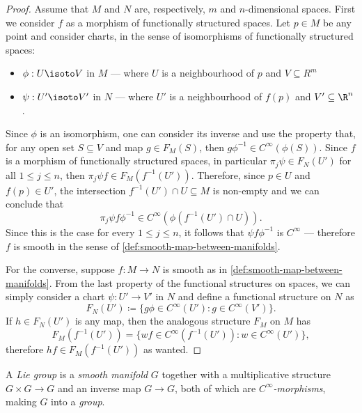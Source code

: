 \begin{proof}
Assume that \(M\) and \(N\) are, respectively, \(m\) and \(n\)-dimensional
spaces. First we consider \(f\) as a morphism of functionally structured spaces.
Let \(p \in M\) be any point and consider charts, in the sense of isomorphisms
of functionally structured spaces:
\begin{itemize}\setlength\itemsep{0em}
\item \(\phi: U \isoto V\) in \(M\) --- where \(U\) is a neighbourhood of \(p\)
  and \(V \subseteq R^m\)

\item \(\psi: U' \isoto V'\) in \(N\) --- where \(U'\) is a neighbourhood of
  \(f(p)\) and \(V' \subseteq \R^n\).
\end{itemize}
Since \(\phi\) is an isomorphism, one can consider its inverse and use the
property that, for any open set \(S \subseteq V\) and map \(g \in F_M(S)\), then
\(g \phi^{-1} \in C^{\infty}(\phi(S))\). Since \(f\) is a morphism of functionally
structured spaces, in particular \(\pi_j \psi \in F_N(U')\) for all \(1 \leq j
\leq n\), then \(\pi_j \psi f \in F_M(f^{-1}(U'))\). Therefore, since \(p \in
U\) and \(f(p) \in U'\), the intersection \(f^{-1}(U') \cap U \subseteq M\) is
non-empty and we can conclude that
\[
\pi_j \psi f \phi^{-1} \in C^{\infty}(\phi(f^{-1}(U') \cap U)).
\]
Since this is the case for every \(1 \leq j \leq n\), it follows that
\(\psi f \phi^{-1}\) is \(C^{\infty}\) --- therefore \(f\) is smooth in the
sense of \cref{def:smooth-map-between-manifolds}.

For the converse, suppose \(f: M \to N\) is smooth as in
\cref{def:smooth-map-between-manifolds}. From the last property of the
functional structures on spaces, we can simply consider a chart \(\psi: U' \to
V'\) in \(N\) and define a functional structure on \(N\) as
\[
F_N(U') \coloneq \{g \phi \in C^{\infty}(U') \colon g \in C^{\infty}(V')\}.
\]
If \(h \in F_N(U')\) is any map, then the analogous structure \(F_M\) on \(M\)
has
\[
F_M(f^{-1}(U')) = \{w f \in C^{\infty}(f^{-1}(U')) \colon w \in C^{\infty}(U')\},
\]
therefore \(h f \in F_M(f^{-1}(U'))\) as wanted.
\end{proof}

\begin{definition}
\label{def:lie-group}
A \emph{Lie group} is a \emph{smooth manifold} \(G\) together with a
multiplicative structure \(G \times G \to G\) and an inverse map \(G \to G\),
both of which are \emph{\(C^{\infty}\)-morphisms}, making \(G\) into a
\emph{group}.
\end{definition}

